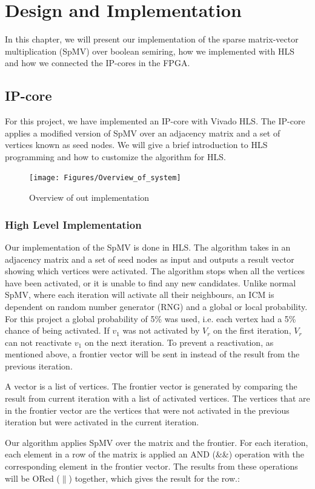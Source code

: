 \chapter{Design and Implementation} \label{methode}
In this chapter, we will present our implementation of the sparse matrix-vector multiplication (SpMV) over boolean semiring, how we implemented with HLS and how we connected the IP-cores in the FPGA.

\section{IP-core}
For this project, we have implemented an IP-core with Vivado HLS. The IP-core applies a modified version of SpMV over an adjacency matrix and a set of vertices known as seed nodes. We will give a brief introduction to HLS programming and how to customize the algorithm for HLS.
\begin{figure}[!ht]
\centerline{\texttt{[image: Figures/Overview\_of\_system]}}
\caption{Overview of out implementation}
    \label{fig:overviewe}
\end{figure}

\subsection{High Level Implementation}
Our implementation of the SpMV is done in HLS. The algorithm takes in an adjacency matrix and a set of seed nodes as input and outputs a result vector showing which vertices were activated. The algorithm stops when all the vertices have been activated, or it is unable to find any new candidates. Unlike normal SpMV, where each iteration will activate all their neighbours, an ICM is dependent on random number generator (RNG) and a global or local probability. For this project a global probability of 5\% was used, i.e. each vertex had a 5\% chance of being activated. If $v_1$ was not activated by $V_r$ on the first iteration, $V_r$ can not reactivate $v_1$ on the next iteration. To prevent a reactivation, as mentioned above, a frontier vector will be sent in instead of the result from the previous iteration. 

A vector is a list of vertices. The frontier vector is generated by comparing the result from current iteration with a list of activated vertices. The vertices that are in the frontier vector are the vertices that were not activated in the previous iteration but were activated in the current iteration. 

Our algorithm applies SpMV over the matrix and the frontier. For each iteration, each element in a row of the matrix is applied an AND (\&\&) operation with the corresponding element in the frontier vector. The results from these operations will be ORed ($\|$) together, which gives the result for the row.:
\begin{algorithm}
\begin{algorithmic}
\end{algorithmic}
\end{algorithm}


